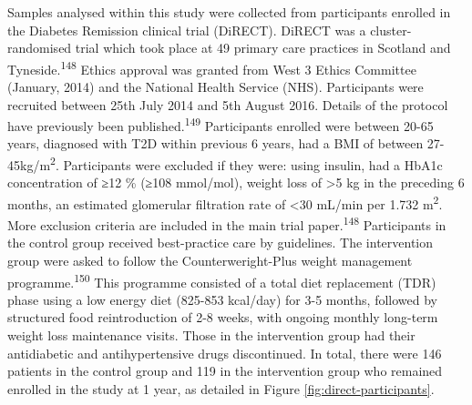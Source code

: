 \documentclass[11pt,twoside]{bristolthesis}
\begin{document}
Samples analysed within this study were collected from participants enrolled in the Diabetes Remission clinical trial (DiRECT). DiRECT was a cluster-randomised trial which took place at 49 primary care practices in Scotland and Tyneside.\textsuperscript{148} Ethics approval was granted from West 3 Ethics Committee (January, 2014) and the National Health Service (NHS). Participants were recruited between 25th July 2014 and 5th August 2016. Details of the protocol have previously been published.\textsuperscript{149} Participants enrolled were between 20-65 years, diagnosed with T2D within previous 6 years, had a BMI of between 27-45kg/m\textsuperscript{2}. Participants were excluded if they were: using insulin, had a HbA1c concentration of ≥12 \% (≥108 mmol/mol), weight loss of \textgreater5 kg in the preceding 6 months, an estimated glomerular filtration rate of \textless30 mL/min per 1.732 m\textsuperscript{2}. More exclusion criteria are included in the main trial paper.\textsuperscript{148} Participants in the control group received best-practice care by guidelines. The intervention group were asked to follow the Counterweright-Plus weight management programme.\textsuperscript{150} This programme consisted of a total diet replacement (TDR) phase using a low energy diet (825-853 kcal/day) for 3-5 months, followed by structured food reintroduction of 2-8 weeks, with ongoing monthly long-term weight loss maintenance visits. Those in the intervention group had their antidiabetic and antihypertensive drugs discontinued. In total, there were 146 patients in the control group and 119 in the intervention group who remained enrolled in the study at 1 year, as detailed in Figure \ref{fig:direct-participants}.
\end{document}
